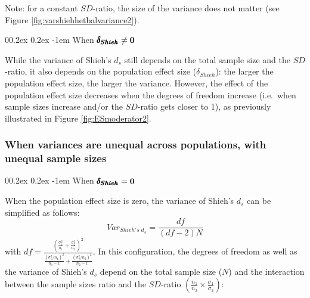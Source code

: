 \documentclass[
  english,
  man]{apa6}
\makeatletter
\let\oldparagraph\paragraph
\renewcommand{\paragraph}[1]{\oldparagraph{#1}\mbox{}}
\renewcommand{\paragraph}{\@startsection{paragraph}{4}{\parindent}%
  {0\baselineskip \@plus 0.2ex \@minus 0.2ex}%
  {-1em}%
  {\normalfont\normalsize\bfseries\itshape\typesectitle}}
\makeatother
\begin{document}
Note: for a constant \(SD\)-ratio, the size of the variance does not matter (see Figure \ref{fig:varshiehhetbalvariance2}).

\hypertarget{when-bf-pmbdelta_shieh-neq-0-1}{%
\paragraph{\texorpdfstring{When \(\bf \pmb{\delta_{Shieh}} \neq 0\)}{When \textbackslash bf \textbackslash pmb\{\textbackslash delta\_\{Shieh\}\} \textbackslash neq 0}}\label{when-bf-pmbdelta_shieh-neq-0-1}}

While the variance of Shieh's \(d_s\) still depends on the total sample size and the \(SD\)-ratio, it also depends on the population effect size (\(\delta_{Shieh}\)): the larger the population effect size, the larger the variance. However, the effect of the population effect size decreases when the degrees of freedom increase (i.e.~when sample sizes increase and/or the \(SD\)-ratio gets closer to 1), as previously illustrated in Figure \ref{fig:ESmoderator2}.

\hypertarget{when-variances-are-unequal-across-populations-with-unequal-sample-sizes-2}{%
\subsubsection{When variances are unequal across populations, with unequal sample sizes}\label{when-variances-are-unequal-across-populations-with-unequal-sample-sizes-2}}

\hypertarget{when-bf-pmbdelta_shieh0-2}{%
\paragraph{\texorpdfstring{When \(\bf \pmb{\delta_{Shieh}}=0\)}{When \textbackslash bf \textbackslash pmb\{\textbackslash delta\_\{Shieh\}\}=0}}\label{when-bf-pmbdelta_shieh0-2}}

When the population effect size is zero, the variance of Shieh's \(d_s\) can be simplified as follows:
\[Var_{Shieh's \; d_s} = \frac{df}{(df-2)N}\]
with \(df = \frac{\left(\frac{\sigma^2_1}{n_1}+\frac{\sigma^2_2}{n_2} \right)^2}{\frac{(\sigma^2_1/n_1)^2}{n_1-1}+\frac{(\sigma^2_2/n_2)^2}{n_2-1}}\). In this configuration, the degrees of freedom as well as the variance of Shieh's \(d_s\) depend on the total sample size (\(N\)) and the interaction between the sample sizes ratio and the \(SD\)-ratio \(\left(\frac{n_1}{n_2}\times\frac{\sigma_1}{\sigma_2} \right)\):
\end{document}
